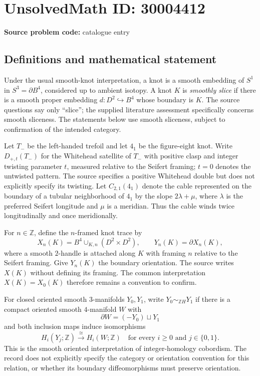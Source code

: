 \documentclass[11pt]{article}
\newcommand{\Z}{\mathbb{Z}}
\begin{document}
\section*{UnsolvedMath ID: 30004412}
\textbf{Source problem code:} catalogue entry
\subsection{Definitions and mathematical statement}
Under the usual smooth-knot interpretation, a knot is a smooth embedding of \(S^1\) in \(S^3=\partial B^4\), considered up to ambient isotopy. A knot \(K\) is \emph{smoothly slice} if there is a smooth proper embedding \(d\colon D^2\hookrightarrow B^4\) whose boundary is \(K\). The source questions say only ``slice''; the supplied literature assessment specifically concerns smooth sliceness. The statements below use smooth sliceness, subject to confirmation of the intended category.

Let \(T_-\) be the left-handed trefoil and let \(4_1\) be the figure-eight knot. Write \(D_{+,t}(T_-)\) for the Whitehead satellite of \(T_-\) with positive clasp and integer twisting parameter \(t\), measured relative to the Seifert framing; \(t=0\) denotes the untwisted pattern. The source specifies a positive Whitehead double but does not explicitly specify its twisting. Let \(C_{2,1}(4_1)\) denote the cable represented on the boundary of a tubular neighborhood of \(4_1\) by the slope \(2\lambda+\mu\), where \(\lambda\) is the preferred Seifert longitude and \(\mu\) is a meridian. Thus the cable winds twice longitudinally and once meridionally.

For \(n\in\Z\), define the \(n\)-framed knot trace by
\[
X_n(K)=B^4\cup_{K,n}(D^2\times D^2),\qquad Y_n(K)=\partial X_n(K),
\]
where a smooth \(2\)-handle is attached along \(K\) with framing \(n\) relative to the Seifert framing. Give \(Y_n(K)\) the boundary orientation. The source writes \(X(K)\) without defining its framing. The common interpretation \(X(K)=X_0(K)\) therefore remains a convention to confirm.

For closed oriented smooth \(3\)-manifolds \(Y_0,Y_1\), write \(Y_0\sim_{\Z H}Y_1\) if there is a compact oriented smooth \(4\)-manifold \(W\) with
\[
\partial W=(-Y_0)\sqcup Y_1
\]
and both inclusion maps induce isomorphisms
\[
H_i(Y_j;\Z)\xrightarrow{\cong}H_i(W;\Z)
\quad\text{for every }i\geq 0\text{ and }j\in\{0,1\}.
\]
This is the smooth oriented interpretation of integer-homology cobordism. The record does not explicitly specify the category or orientation convention for this relation, or whether its boundary diffeomorphisms must preserve orientation.
\end{document}
